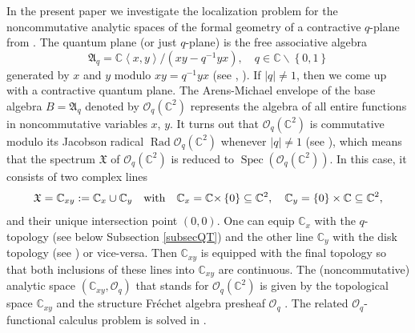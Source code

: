 \documentclass[12pt,reqno]{amsart}%
\theoremstyle{plain}
\numberwithin{theorem}{section} \numberwithin{equation}{section}
\numberwithin{lemma}{section}
\numberwithin{remark}{section}
\numberwithin{example}{section}
\numberwithin{proposition}{section}
\numberwithin{definition}{section}
\numberwithin{corollary}{section}
\begin{document}
In the present paper we investigate the localization problem for the
noncommutative analytic spaces of the formal geometry of a contractive
$q$-plane from \cite{Dosi25}. The quantum plane (or just $q$-plane) is the
free associative algebra
\[
\mathfrak{A}_{q}=\mathbb{C}\left\langle x,y\right\rangle /\left(
xy-q^{-1}yx\right)  ,\quad q\in\mathbb{C}\backslash\left\{  0,1\right\}
\]
generated by $x$ and $y$ modulo $xy=q^{-1}yx$ (see \cite{M}, \cite{Goor}). If
$\left\vert q\right\vert \neq1$, then we come up with a contractive quantum
plane. The Arens-Michael envelope of the base algebra $B=\mathfrak{A}_{q}$
denoted by $\mathcal{O}_{q}\left(  \mathbb{C}^{2}\right)  $ represents the
algebra of all entire functions in noncommutative variables $x$, $y$. It turns
out that $\mathcal{O}_{q}\left(  \mathbb{C}^{2}\right)  $ is commutative
modulo its Jacobson radical $\operatorname{Rad}\mathcal{O}_{q}\left(
\mathbb{C}^{2}\right)  $ whenever $\left\vert q\right\vert \neq1$ (see
\cite{Dosi24}), which means that the spectrum $\mathfrak{X}$ of $\mathcal{O}%
_{q}\left(  \mathbb{C}^{2}\right)  $ is reduced to $\operatorname{Spec}\left(
\mathcal{O}_{q}\left(  \mathbb{C}^{2}\right)  \right)  $. In this case, it
consists of two complex lines
\[
\mathfrak{X}=\mathbb{C}_{xy}:=\mathbb{C}_{x}\cup\mathbb{C}_{y}\quad
\text{with\quad}\mathbb{C}_{x}=\mathbb{C\times}\left\{  0\right\}
\subseteq\mathbb{C}^{2},\quad\mathbb{C}_{y}=\left\{  0\right\}  \times
\mathbb{C\subseteq C}^{2},
\]
and their unique intersection point $\left(  0,0\right)  $. One can equip
$\mathbb{C}_{x}$ with the $q$-topology (see below Subsection \ref{subsecQT})
and the other line $\mathbb{C}_{y}$ with the disk topology (see \cite{Dosi24})
or vice-versa. Then $\mathbb{C}_{xy}$ is equipped with the final topology so
that both inclusions of these lines into $\mathbb{C}_{xy}$ are continuous. The
(noncommutative) analytic space $\left(  \mathbb{C}_{xy},\mathcal{O}%
_{q}\right)  $ that stands for $\mathcal{O}_{q}\left(  \mathbb{C}^{2}\right)
$ is given by the topological space $\mathbb{C}_{xy}$ and the structure
Fr\'{e}chet algebra presheaf $\mathcal{O}_{q}$ \cite{Dosi24}. The related
$\mathcal{O}_{q}$-functional calculus problem is solved in \cite{Dosi24}.
\end{document}
